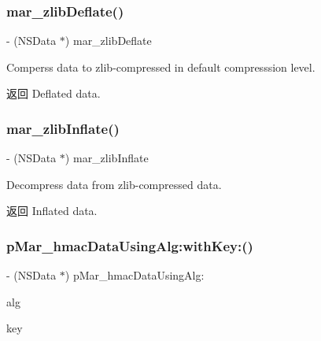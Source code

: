 \subsubsection{\texorpdfstring{mar\+\_\+zlib\+Deflate()}{mar\_zlibDeflate()}}
{\footnotesize\ttfamily -\/ (N\+S\+Data $\ast$) mar\+\_\+zlib\+Deflate \begin{DoxyParamCaption}{ }\end{DoxyParamCaption}}

Comperss data to zlib-\/compressed in default compresssion level. \begin{DoxyReturn}{返回}
Deflated data. 
\end{DoxyReturn}
\mbox{\label{category_n_s_data_07_m_a_r_e_x_08_a34e39334da82728340d3ba03f38cfeba}} 
\subsubsection{\texorpdfstring{mar\+\_\+zlib\+Inflate()}{mar\_zlibInflate()}}
{\footnotesize\ttfamily -\/ (N\+S\+Data $\ast$) mar\+\_\+zlib\+Inflate \begin{DoxyParamCaption}{ }\end{DoxyParamCaption}}

Decompress data from zlib-\/compressed data. \begin{DoxyReturn}{返回}
Inflated data. 
\end{DoxyReturn}
\mbox{\label{category_n_s_data_07_m_a_r_e_x_08_a8f37f0cd2bff0fd53201d3bdec3856a4}} 
\subsubsection{\texorpdfstring{p\+Mar\+\_\+hmac\+Data\+Using\+Alg\+:with\+Key\+:()}{pMar\_hmacDataUsingAlg:withKey:()}}
{\footnotesize\ttfamily -\/ (N\+S\+Data $\ast$) p\+Mar\+\_\+hmac\+Data\+Using\+Alg\+: \begin{DoxyParamCaption}\item[{(C\+C\+Hmac\+Algorithm)}]{alg }\item[{withKey:(N\+S\+Data $\ast$)}]{key }\end{DoxyParamCaption}\hspace{0.3cm}{\ttfamily [implementation]}}

